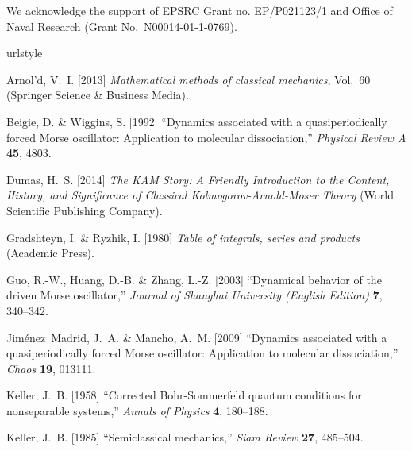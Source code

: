 \documentclass{ws-ijbc}
\begin{document}
  \noindent We acknowledge the support of  EPSRC Grant no. EP/P021123/1
and   Office of Naval Research (Grant No.~N00014-01-1-0769).





\begin{thebibliography}{16}
\newcommand{\enquote}[1]{``#1''}
\providecommand{\natexlab}[1]{#1}
\providecommand{\url}[1]{\texttt{#1}}
\providecommand{\urlprefix}{URL }
\expandafter\ifx\csname urlstyle\endcsname\relax
  \providecommand{\doi}[1]{doi:\discretionary{}{}{}#1}\else
  \providecommand{\doi}{doi:\discretionary{}{}{}\begingroup
  \urlstyle{rm}\Url}\fi

Arnol'd, V.~I. [2013] \emph{Mathematical methods of classical mechanics},
  Vol.~60 (Springer Science \& Business Media).

Beigie, D. \& Wiggins, S. [1992] \enquote{Dynamics associated with a
  quasiperiodically forced {M}orse oscillator: Application to molecular
  dissociation,} \emph{Physical Review A} \textbf{45},  4803.

Dumas, H.~S. [2014] \emph{The KAM Story: A Friendly Introduction to the
  Content, History, and Significance of Classical Kolmogorov-Arnold-Moser
  Theory} (World Scientific Publishing Company).

Gradshteyn, I. \& Ryzhik, I. [1980] \emph{Table of integrals, series and
  products} (Academic Press).

Guo, R.-W., Huang, D.-B. \& Zhang, L.-Z. [2003] \enquote{Dynamical behavior of
  the driven {M}orse oscillator,} \emph{Journal of Shanghai University (English
  Edition)} \textbf{7},  340--342.

Jiménez~Madrid, J.~A. \& Mancho, A.~M. [2009] \enquote{Dynamics associated
  with a quasiperiodically forced {M}orse oscillator: Application to molecular
  dissociation,} \emph{Chaos} \textbf{19},  013111.

Keller, J.~B. [1958] \enquote{Corrected {B}ohr-{S}ommerfeld quantum conditions
  for nonseparable systems,} \emph{Annals of Physics} \textbf{4},  180--188.

Keller, J.~B. [1985] \enquote{Semiclassical mechanics,} \emph{Siam Review}
  \textbf{27},  485--504.


\end{thebibliography}
\end{document}
